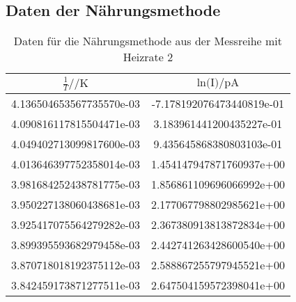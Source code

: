 \subsection{Daten der Nährungsmethode}

\begin{table}
 \centering
 \begin{tabular}{S[round-mode = places , round-precision = 4,scientific-notation=fixed, fixed-exponent = 0] S[round-mode = places , round-precision = 2,scientific-notation=fixed, fixed-exponent = 0]}
   \toprule
    $\frac{1}{T} / \si{\per\kelvin}$ &  $ \text{ln(I)} / \si{\pico\ampere} $\\
   \midrule
	4.136504653567735570e-03 & -7.178192076473440819e-01\\
	4.090816117815504471e-03 & 3.183961441200435227e-01\\
	4.049402713099817600e-03 & 9.435645868380803103e-01\\
	4.013646397752358014e-03 & 1.454147947871760937e+00\\
	3.981684252438781775e-03 & 1.856861109696066992e+00\\
	3.950227138060438681e-03 & 2.177067798802985621e+00\\
	3.925417075564279282e-03 & 2.367380913813872834e+00\\
	3.899395593682979458e-03 & 2.442741263428600540e+00\\
	3.870718018192375112e-03 & 2.588867255797945521e+00\\
	3.842459173871277511e-03 & 2.647504159572398041e+00\\
   \bottomrule
 \end{tabular}
 \caption{Daten für die Nährungsmethode aus der Messreihe mit Heizrate 2}
 \label{tab:WM12tab}
\end{table}


